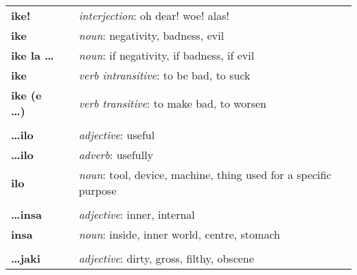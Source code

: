 \begin{supertabular}{p{2,5cm}|ll}
    \textbf{ike!}                &  & \textit{interjection}: oh dear! woe! alas!                                                                 \\
    \textbf{ike}                 &  & \textit{noun}: negativity, badness, evil                                                                   \\
    \textbf{ike la \dots}        &  & \textit{noun}: if negativity, if badness, if evil                                                          \\
    \textbf{ike}                 &  & \textit{verb intransitive}: to be bad, to suck                                                             \\
    \textbf{ike (e \dots)}       &  & \textit{verb transitive}: to make bad, to worsen                                                           \\
                                 &  &                                                                                                            \\ %
    \textbf{\dots ilo}           &  & \textit{adjective}: useful                                                                                 \\
    \textbf{\dots ilo}           &  & \textit{adverb}: usefully                                                                                  \\
    \textbf{ilo}                 &  & \textit{noun}: tool, device, machine, thing used for a specific purpose                                    \\
                                 &  &                                                                                                            \\ %
    \textbf{\dots insa}          &  & \textit{adjective}: inner, internal                                                                        \\
    \textbf{insa}                &  & \textit{noun}: inside, inner world, centre, stomach                                                        \\
                                 &  &                                                                                                            \\ %
    \textbf{\dots jaki}          &  & \textit{adjective}: dirty, gross, filthy, obscene                                                          \\

\end{supertabular}
